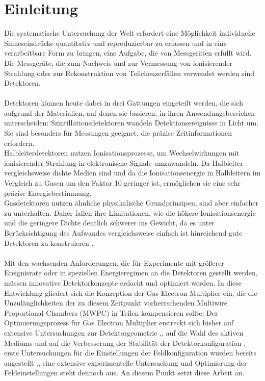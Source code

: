 \chapter{Einleitung}


\noindent Die systematische Untersuchung der Welt erfordert eine Möglichkeit individuelle Sinneseindrücke quantitativ und reproduzierbar zu erfassen und in eine verarbeitbare Form zu bringen, eine Aufgabe, die von Messgeräten erfüllt wird. Die Messgeräte, die zum Nachweis und zur Vermessung von ionisierender Strahlung oder zur Rekonstruktion von Teilchenzerfällen verwendet werden sind Detektoren.\\
\\
Detektoren können heute dabei in drei Gattungen eingeteilt werden, die sich aufgrund der Materialien, auf denen sie basieren, in ihren Anwendungsbereichen unterscheiden: Szintillationsdetektoren wandeln Detektionsereignisse in Licht um. Sie sind besonders für Messungen geeignet, die präzise Zeitinformationen erfordern.\\
Halbleiterdetektoren nutzen Ionisationsprozesse, um Wechselwirkungen mit ionisierender Strahlung in elektronische Signale umzuwandeln. Da Halbleiter vergleichsweise dichte Medien sind und da die Ionisationsenergie in Halbleitern im Vergleich zu Gasen um den Faktor 10 geringer ist, ermöglichen sie eine sehr präzise Energiebestimmung.\\
Gasdetektoren nutzen ähnliche physikalische Grundprinzipen, sind aber einfacher zu unterhalten. Daher fallen ihre Limitationen, wie die höhere Ionisationsenergie und die geringere Dichte deutlich schwerer ins Gewicht, da es unter Berücksichtigung des Aufwandes vergleichsweise einfach ist hinreichend gute Detektoren zu konstruieren \cite{Leo}.\\
\\
Mit den wachsenden Anforderungen, die für Experimente mit größerer Ereignisrate oder in speziellen Energieregimen an die Detektoren gestellt werden, müssen innovative Detektorkonzepte erdacht und optimiert werden. In diese Entwicklung gliedert sich die Konzeption der Gas Electron Multiplier ein, die die Unzulänglichkeiten der zu diesem Zeitpunkt vorherrschenden Multiwire Proportional Chambers (MWPC) \cite{Sauli_Multiwire} \cite{GEM_Introduction} in Teilen kompensieren sollte. Der Optimierungsprozess für Gas Electron Multiplier erstreckt sich bisher auf extensive Untersuchungen zur Detektorgeometrie \cite{BUTTNER},\cite{Bachmann}, auf die Wahl des aktiven Mediums \cite{GAS_MIX} und auf die Verbesserung der Stabilität der Detektorkonfiguration \cite{Stabilitaet_Discharge}, erste Untersuchungen für die Einstellungen  der Feldkonfiguration wurden bereits angestellt \cite{Bachmann},\cite{ottnad}, eine extensive experimentelle Untersuchung und Optimierung der Feldeinstellungen steht dennoch aus. An diesem Punkt setzt diese Arbeit an.\\
